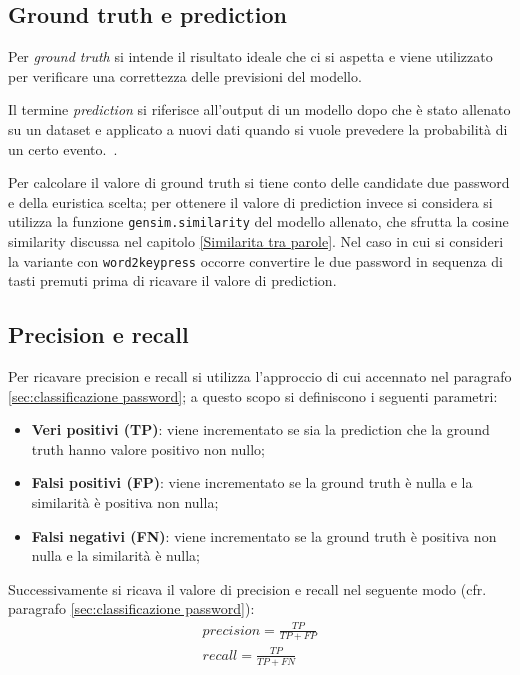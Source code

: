\subsection{Ground truth e prediction}
\label{sec:ground truth e prediction}
Per \emph{ground truth} si intende il risultato ideale che ci si aspetta e viene utilizzato per verificare una correttezza delle previsioni del modello.~\cite{lemoigne2008molecular}

Il termine \emph{prediction} si riferisce all'output di un modello dopo che è stato allenato su un dataset e applicato a nuovi dati quando si vuole prevedere la probabilità di un certo evento.~\cite{prediction}.

Per calcolare il valore di ground truth si tiene conto delle candidate due password e della euristica scelta; per ottenere il valore di prediction invece si considera si utilizza la funzione \texttt{gensim.similarity} del modello allenato, che sfrutta la cosine similarity discussa nel capitolo \ref{Similarita tra parole}.
Nel caso in cui si consideri la variante con \texttt{word2keypress} occorre convertire le due password in sequenza di tasti premuti prima di ricavare il valore di prediction.
\subsection{Precision e recall}
Per ricavare precision e recall si utilizza l'approccio di cui accennato nel paragrafo \ref{sec:classificazione password}; a questo scopo si definiscono i seguenti parametri:
\begin{itemize}
    \item \textbf{Veri positivi (TP)}: viene incrementato se sia la prediction che la ground truth hanno valore positivo non nullo;
    \item \textbf{Falsi positivi (FP)}: viene incrementato se la ground truth è nulla e la similarità è positiva non nulla;
    \item \textbf{Falsi negativi (FN)}: viene incrementato se la ground truth è positiva non nulla e la similarità è nulla;
\end{itemize}
Successivamente si ricava il valore di precision e recall nel seguente modo (cfr. paragrafo \ref{sec:classificazione password}):
\begin{gather*}
precision = \frac{TP}{TP + FP}
\\
recall = \frac{TP}{TP + FN}
\end{gather*}

